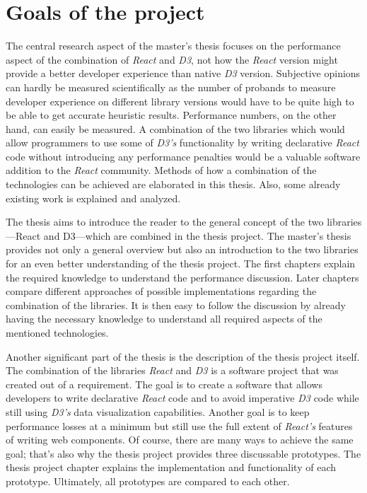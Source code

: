 \section{Goals of the project}

The central research aspect of the master's thesis focuses on the performance aspect of the combination of \emph{React} and \emph{D3}, not how the \emph{React} version might provide a better developer experience than native \emph{D3} version. Subjective opinions can hardly be measured scientifically as the number of probands to measure developer experience on different library versions would have to be quite high to be able to get accurate heuristic results. Performance numbers, on the other hand, can easily be measured. A combination of the two libraries which would allow programmers to use some of \emph{D3's} functionality by writing declarative \emph{React} code without introducing any performance penalties would be a valuable software addition to the \emph{React} community. Methods of how a combination of the technologies can be achieved are elaborated in this thesis. Also, some already existing work is explained and analyzed.

The thesis aims to introduce the reader to the general concept of the two libraries---React and D3---which are combined in the thesis project. The master's thesis provides not only a general overview but also an introduction to the two libraries for an even better understanding of the thesis project. The first chapters explain the required knowledge to understand the performance discussion. Later chapters compare different approaches of possible implementations regarding the combination of the libraries. It is then easy to follow the discussion by already having the necessary knowledge to understand all required aspects of the mentioned technologies.

Another significant part of the thesis is the description of the thesis project itself. The combination of the libraries \emph{React} and \emph{D3} is a software project that was created out of a requirement. The goal is to create a software that allows developers to write declarative \emph{React} code and to avoid imperative \emph{D3} code while still using \emph{D3's} data visualization capabilities. Another goal is to keep performance losses at a minimum but still use the full extent of \emph{React's} features of writing web components. Of course, there are many ways to achieve the same goal; that's also why the thesis project provides three discussable prototypes. The thesis project chapter explains the implementation and functionality of each prototype. Ultimately, all prototypes are compared to each other.

